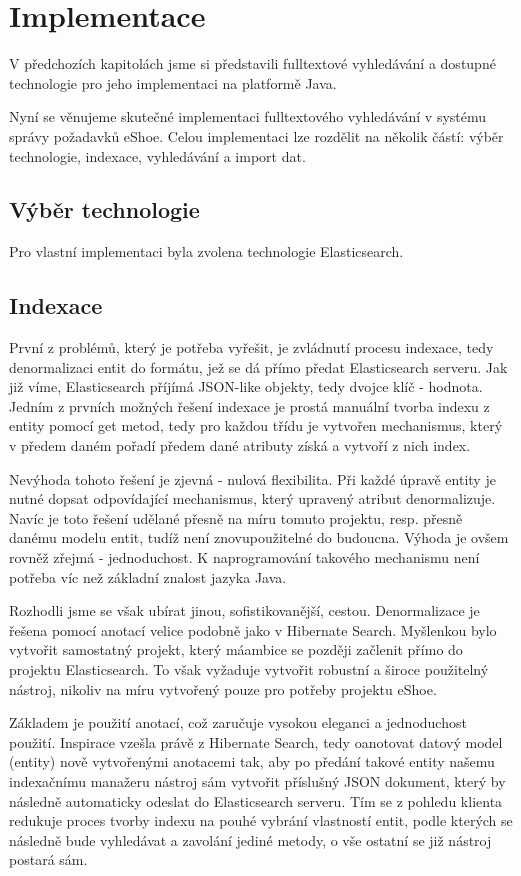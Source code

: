 \documentclass[11pt,draft,oneside]{fithesis2}
\begin{document}
\chapter{Implementace}
V předchozích kapitolách jsme si představili fulltextové vyhledávání a dostupné technologie pro jeho implementaci na platformě Java. 

Nyní se věnujeme skutečné implementaci fulltextového vyhledávání v systému správy požadavků eShoe. Celou implementaci lze rozdělit na několik částí: výběr technologie, indexace, vyhledávání a import dat.

\section{Výběr technologie}
Pro vlastní implementaci byla zvolena technologie Elasticsearch. 

\section{Indexace}
První z problémů, který je potřeba vyřešit, je zvládnutí procesu indexace, tedy denormalizaci entit do formátu, jež se dá přímo předat Elasticsearch serveru. Jak již víme, Elasticsearch příjímá JSON-like objekty,
tedy dvojce klíč - hodnota.
Jedním z prvních možných řešení indexace je prostá manuální tvorba indexu z entity pomocí get metod, tedy pro každou třídu je vytvořen mechanismus, který v předem daném pořadí předem dané atributy získá a vytvoří z nich index.

Nevýhoda tohoto řešení je zjevná - nulová flexibilita. Při každé úpravě entity je nutné dopsat odpovídající mechanismus, který upravený atribut denormalizuje. Navíc je toto řešení udělané přesně na míru tomuto projektu, resp. přesně danému modelu entit,
tudíž není znovupoužitelné do budoucna. Výhoda je ovšem rovněž zřejmá - jednoduchost. K naprogramování takového mechanismu není potřeba víc než základní znalost jazyka Java.

Rozhodli jsme se však ubírat jinou, sofistikovanější, cestou. Denormalizace je řešena pomocí anotací velice podobně jako v Hibernate Search. Myšlenkou bylo vytvořit samostatný projekt, který máambice se později začlenit přímo do projektu
Elasticsearch. To však vyžaduje vytvořit robustní a široce použitelný nástroj, nikoliv na míru vytvořený pouze pro potřeby projektu eShoe. 

Základem je použití anotací, což zaručuje vysokou eleganci a jednoduchost použití. Inspirace vzešla právě z Hibernate Search, tedy oanotovat datový model (entity) nově vytvořenými anotacemi tak, aby po předání takové entity našemu indexačnímu manažeru
nástroj sám vytvořit příslušný JSON dokument, který by následně automaticky odeslat do Elasticsearch serveru. Tím se z pohledu klienta redukuje proces tvorby indexu na pouhé vybrání vlastností entit, podle kterých se následně bude vyhledávat a
zavolání jediné metody, o vše ostatní se již nástroj postará sám.
\end{document}
